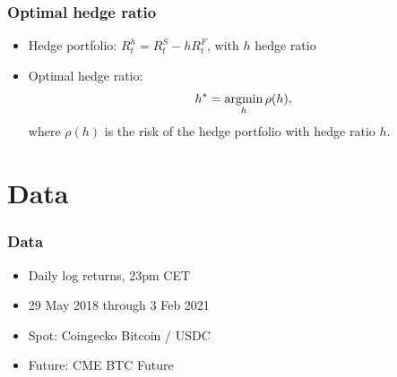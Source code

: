 \documentclass[10pt,mathserif,notes=show]{beamer}
\newcommand{\argmin}{\operatornamewithlimits{argmin}}
\renewcommand{\(}{\begin{columns}}
\renewcommand{\)}{\end{columns}}
\newcommand{\<}[1]{\begin{column}{#1}}
\renewcommand{\>}{\end{column}}
\theoremstyle{definition}
\begin{document}
\begin{frame}
  \frametitle{Optimal hedge ratio}
  \begin{itemize}
    \addtolength{\itemsep}{3pt}
  \item Hedge portfolio: $R_t^h = R_t^S - h R_t^F$, with $h$ hedge
    ratio
  \item Optimal hedge ratio:
    \begin{equation*}
h^\ast = \argmin_h \rho(h),%
\end{equation*}
where $\rho(h)$ is the risk of the hedge portfolio with hedge ratio
$h$. 
  \end{itemize}
\end{frame}

\section{Data}

\begin{frame}
  \frametitle{Data}
  \begin{itemize}
  \item Daily log returns, 23pm CET
  \item 29 May 2018 through 3 Feb 2021
  \item Spot: Coingecko Bitcoin / USDC 
  \item Future: CME BTC Future
  \end{itemize}
\end{frame}
\end{document}
